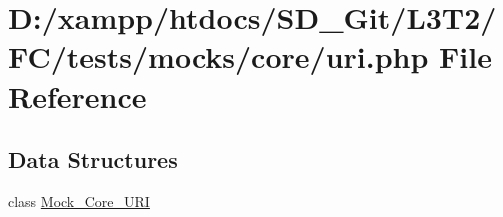 \hypertarget{tests_2mocks_2core_2_u_r_i_8php}{}\section{D\+:/xampp/htdocs/\+S\+D\+\_\+\+Git/\+L3\+T2/\+F\+C/tests/mocks/core/uri.php File Reference}
\label{tests_2mocks_2core_2_u_r_i_8php}
\subsection*{Data Structures}
\begin{DoxyCompactItemize}
\item 
class \hyperlink{class_mock___core___u_r_i}{Mock\+\_\+\+Core\+\_\+\+U\+R\+I}
\end{DoxyCompactItemize}
